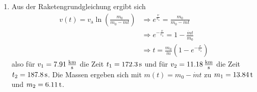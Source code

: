 \documentclass[a4paper]{scrartcl}
\begin{document}
\begin{enumerate}[noitemsep]
\item Aus der Raketengrundgleichung ergibt sich
  \begin{align*}
    v(t) = v_\text{a} \ln \left( \frac{m_0}{m_0-\dot mt} \right) & \Rightarrow e^{\frac{v}{v_\text{a}}} = \frac{m_0}{m_0-\dot mt} \\
    & \Rightarrow e^{-\frac{v}{v_\text{a}}} =  1- \frac{\dot mt}{m_0} \\
    & \Rightarrow t = \frac{m_0}{\dot m}\left(1-e^{-\frac{v}{v_\text{a}}}\right)
  \end{align*}
  also für $v_1 = \unit[7.91]{\frac{km}{s}}$ die Zeit $t_1 = \unit[172.3]{s}$ und für $v_2 = \unit[11.18]{\frac{km}{s}}$ die Zeit $t_2 = \unit[187.8]{s}$. Die Massen ergeben sich mit $m(t) = m_0 - \dot mt$ zu $m_1 = \unit[13.84]{t}$ und $m_2 = \unit[6.11]{t}$.
\end{enumerate}
\end{document}
